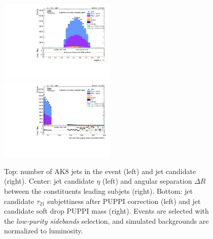 \begin{figure}[!htb]
\begin{center}
    \includegraphics[width=0.495\textwidth]{plots/v9_U/XVZnnlpSB/FatJet1_puppiTau21.pdf}
    \includegraphics[width=0.495\textwidth]{plots/v9_U/XVZnnlpSB/FatJet1_softdropPuppiMassCorr.pdf}

    \caption{Top: number of AK8 jets in the event (left) and \V jet candidate \pt (right). Center: \V jet candidate $\eta$ (left) and angular separation $\Delta R$ between the constituents leading subjets (right). Bottom: \V jet candidate $\tau_{21}$ subjettiness after PUPPI correction (left) and \V jet candidate soft drop PUPPI mass (right). Events are selected with the \emph{low-purity sidebands} selection, and simulated backgrounds are normalized to luminosity.}
  \end{center}
\end{figure}

\clearpage

